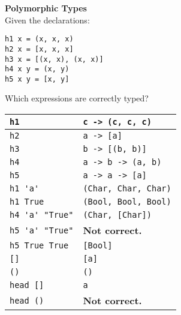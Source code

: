 \textbf{Polymorphic Types}\\
Given the declarations:
\begin{lstlisting}
h1 x = (x, x, x)
h2 x = [x, x, x]
h3 x = [(x, x), (x, x)]
h4 x y = (x, y)
h5 x y = [x, y]
\end{lstlisting}
Which expressions are correctly typed?\\
\begin{tabularx}{\linewidth}{|X|X|}
  \hline
  \lstinline|h1| & \lstinline|c -> (c, c, c)|\\
  \hline
  \lstinline|h2| & \lstinline|a -> [a]|\\
  \hline
  \lstinline|h3| & \lstinline|b -> [(b, b)]|\\
  \hline
  \lstinline|h4| & \lstinline|a -> b -> (a, b)|\\
  \hline
  \lstinline|h5| & \lstinline|a -> a -> [a]|\\
  \hline
  \lstinline|h1 'a'| & \lstinline|(Char, Char, Char)|\\
  \hline
  \lstinline|h1 True| & \lstinline|(Bool, Bool, Bool)|\\
  \hline
  \lstinline|h4 'a' "True"| & \lstinline|(Char, [Char])|\\
  \hline
  \lstinline|h5 'a' "True"| & \textbf{Not correct.}\\
  \hline
  \lstinline|h5 True True| & \lstinline|[Bool]|\\
  \hline
  \lstinline|[]| & \lstinline|[a]|\\
  \hline
  \lstinline|()| & \lstinline|()|\\
  \hline
  \lstinline|head []| & \lstinline|a|\\
  \hline
  \lstinline|head ()| & \textbf{Not correct.}\\
  \hline
\end{tabularx}